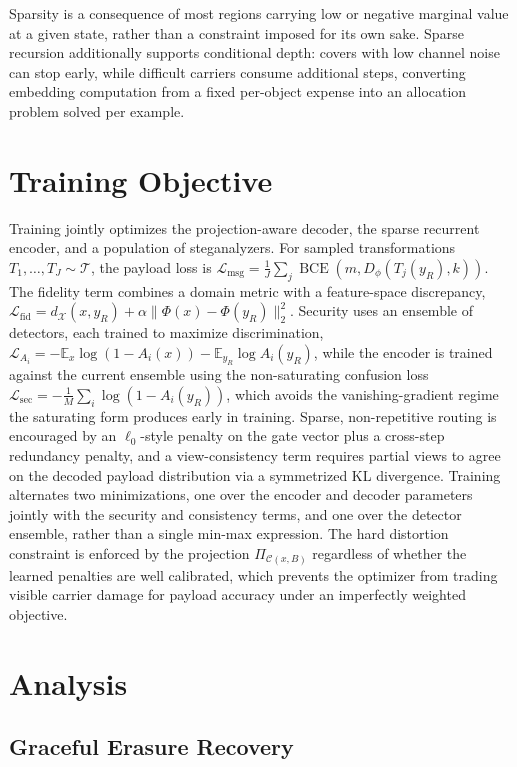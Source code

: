 Sparsity is a consequence of most regions carrying low or negative marginal value at a given state, rather than a constraint imposed for its own sake. Sparse recursion additionally supports conditional depth: covers with low channel noise can stop early, while difficult carriers consume additional steps, converting embedding computation from a fixed per-object expense into an allocation problem solved per example.

\section{Training Objective}

Training jointly optimizes the projection-aware decoder, the sparse recurrent encoder, and a population of steganalyzers. For sampled transformations $T_1,\ldots,T_J \sim \mathcal{T}$, the payload loss is $\mathcal{L}_{\mathrm{msg}} = \frac{1}{J}\sum_j \operatorname{BCE}(m, D_\phi(T_j(y_R),k))$. The fidelity term combines a domain metric with a feature-space discrepancy, $\mathcal{L}_{\mathrm{fid}} = d_\mathcal{X}(x,y_R) + \alpha\|\Phi(x)-\Phi(y_R)\|_2^2$. Security uses an ensemble of detectors, each trained to maximize discrimination, $\mathcal{L}_{A_i} = -\mathbb{E}_x \log(1-A_i(x)) - \mathbb{E}_{y_R}\log A_i(y_R)$, while the encoder is trained against the current ensemble using the non-saturating confusion loss $\mathcal{L}_{\mathrm{sec}} = -\frac{1}{M}\sum_i \log(1-A_i(y_R))$, which avoids the vanishing-gradient regime the saturating form produces early in training. Sparse, non-repetitive routing is encouraged by an $\ell_0$-style penalty on the gate vector plus a cross-step redundancy penalty, and a view-consistency term requires partial views to agree on the decoded payload distribution via a symmetrized KL divergence. Training alternates two minimizations, one over the encoder and decoder parameters jointly with the security and consistency terms, and one over the detector ensemble, rather than a single min-max expression. The hard distortion constraint is enforced by the projection $\Pi_{\mathcal{C}(x,B)}$ regardless of whether the learned penalties are well calibrated, which prevents the optimizer from trading visible carrier damage for payload accuracy under an imperfectly weighted objective.

\section{Analysis}

\subsection{Graceful Erasure Recovery}

